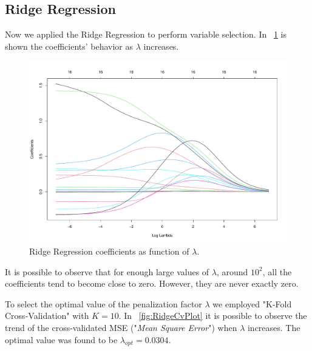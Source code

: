 \subsection{Ridge Regression}

Now we applied the Ridge Regression to perform variable selection. In \Fig~\ref{fig:RidgeCoefVsLambda} is shown the coefficients' behavior as $\lambda$ increases. 

\begin{figure}[h]
	\centering
	\includegraphics[width=0.4\linewidth]{ImageFiles/Regression/Ridge/RidgeCoefVsLambda}
	\caption{Ridge Regression coefficients as function of $\lambda$.}
	\label{fig:RidgeCoefVsLambda}
\end{figure}

It is possible to observe that for enough large values of $\lambda$, around $10^2$, all the coefficients tend to become close to zero. However, they are never exactly zero.

To select the optimal value of the penalization factor $\lambda$ we employed "K-Fold Cross-Validation" with $K=10$. In \Fig~\ref{fig:RidgeCvPlot} it is possible to observe the trend of the cross-validated MSE ("\textit{Mean Square Error}") when $\lambda$ increases. The optimal value was found to be $\lambda_{opt} = 0.0304$.

